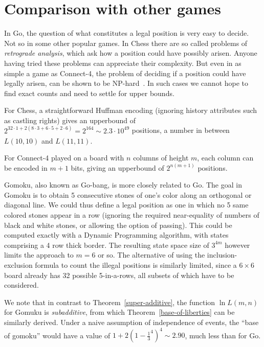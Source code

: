 \documentclass{article}
\begin{document}
\section{Comparison with other games}
\label{othergames}
In Go, the question of what constitutes a legal position
is very easy to decide. Not so in some other popular
games. In Chess there are so called problems of {\em retrograde analysis},
which ask how a position could have possibly arisen. Anyone having
tried these problems can appreciate their complexity.
But even in as simple a game as Connect-4, the problem
of deciding if a position could have legally arisen, can be shown to
be NP-hard~\cite{GW}. In such cases we cannot hope to find exact counts
and need to settle for upper bounds.

For Chess, a straightforward Huffman encoding
(ignoring history attributes such as castling rights) gives an upperbound of
$2^{32\cdot1 + 2(8\cdot 3+6\cdot 5 + 2 \cdot 6)}
= 2^{164} \sim 2.3 \cdot 10^{49}$
positions, a number in between $L(10,10)$ and $L(11,11)$.

For Connect-4 played on a board with $n$ columns of height $m$, each column
can be encoded in $m+1$ bits, giving an upperbound of $2^{n(m+1)}$ positions.

Gomoku, also known as Go-bang, is more closely related to Go.
The goal in Gomoku is to obtain 5 consecutive
stones of one's color along an orthogonal or diagonal line.
We could thus define a legal position as one
in which no 5 same colored stones appear in a row (ignoring the required
near-equality of numbers of black and white stones, or allowing the option
of passing).
This could be computed exactly with a Dynamic Programming algorithm,
with states comprising a 4 row thick border. The resulting state space
size of $3^{4m}$ however limits the approach to $m=6$ or so. 
The alternative of using the inclusion-exclusion formula to count
the illegal positions is similarly limited, since a $6 \times 6$ board
already has 32 possible 5-in-a-rows, all subsets of which have to be
considered.

We note that in contrast to Theorem~\ref{super-additive},
the function $\ln L(m,n)$ for Gomuku is {\em subadditive}, from which
Theorem~\ref{base-of-liberties} can be similarly derived.
Under a naive assumption of independence of events,
the ``base of gomoku'' would have a value of
$1+2(1-\frac{1}{3}^4)^4 \sim 2.90$, much less than for Go.
\end{document}
